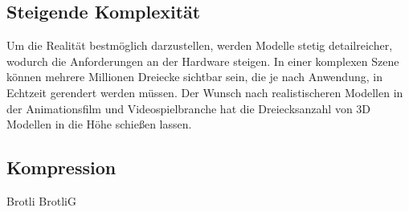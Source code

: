 \subsection{Steigende Komplexität}
\label{subsec:steigende_komplexität}
Um die Realität bestmöglich darzustellen, werden Modelle stetig detailreicher, wodurch die Anforderungen an der Hardware steigen. In einer komplexen Szene können mehrere Millionen Dreiecke sichtbar sein, die je nach Anwendung, in Echtzeit gerendert werden müssen. Der Wunsch nach realistischeren Modellen in der Animationsfilm und Videospielbranche hat die Dreiecksanzahl von 3D Modellen in die Höhe schießen lassen. 

\subsection{Kompression}
Brotli
BrotliG